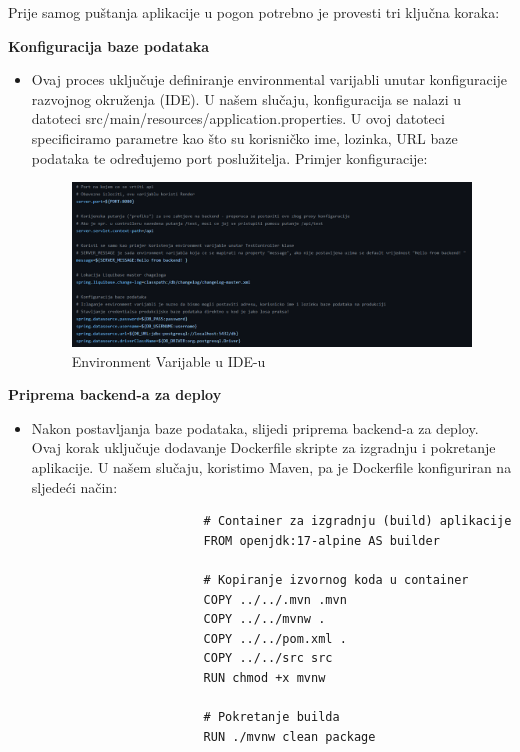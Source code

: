 			Prije samog puštanja aplikacije u pogon potrebno je provesti tri ključna koraka:
			\begin{packed_enum}
				\item \textbf{Konfiguracija baze podataka}
				\begin{itemize}
					\item Ovaj proces uključuje definiranje environmental varijabli unutar konfiguracije razvojnog okruženja (IDE). U našem slučaju, konfiguracija se nalazi u datoteci src/main/resources/application.properties. U ovoj datoteci specificiramo parametre kao što su korisničko ime, lozinka, URL baze podataka te određujemo port poslužitelja. Primjer konfiguracije:
					\begin{figure}[H]
						\includegraphics[scale=0.5]{slike/EnvironmentVarijable}
						\centering
						\caption{Environment Varijable u IDE-u}
						\label{fig:EnvVar}
					\end{figure}
					
						
				\end{itemize}
				\item \textbf{Priprema backend-a za deploy}
				\begin{itemize}
					\item Nakon postavljanja baze podataka, slijedi priprema backend-a za deploy. Ovaj korak uključuje dodavanje Dockerfile skripte za izgradnju i pokretanje aplikacije.  U našem slučaju, koristimo Maven, pa je Dockerfile konfiguriran na sljedeći način:
					\begin{lstlisting}
						# Container za izgradnju (build) aplikacije
						FROM openjdk:17-alpine AS builder
						
						# Kopiranje izvornog koda u container
						COPY ../../.mvn .mvn
						COPY ../../mvnw .
						COPY ../../pom.xml .
						COPY ../../src src
						RUN chmod +x mvnw
						
						# Pokretanje builda
						RUN ./mvnw clean package
						

\end{lstlisting}
\end{itemize}
\end{packed_enum}
